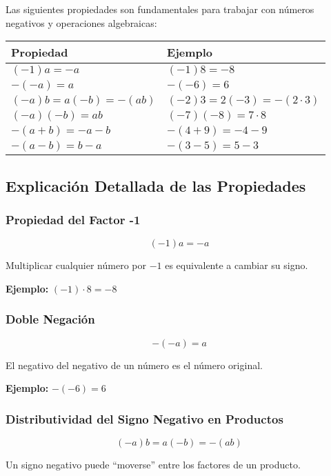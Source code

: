 
Las siguientes propiedades son fundamentales para trabajar con números negativos y operaciones algebraicas:

\begin{center}
\begin{tabular}{|l|l|}
\hline
\textbf{Propiedad} & \textbf{Ejemplo} \\
\hline
$(-1)a = -a$ & $(-1)8 = -8$ \\
\hline
$-(-a) = a$ & $-(-6) = 6$ \\
\hline
$(-a)b = a(-b) = -(ab)$ & $(-2)3 = 2(-3) = -(2 \cdot 3)$ \\
\hline
$(-a)(-b) = ab$ & $(-7)(-8) = 7 \cdot 8$ \\
\hline
$-(a + b) = -a - b$ & $-(4 + 9) = -4 - 9$ \\
\hline
$-(a - b) = b - a$ & $-(3 - 5) = 5 - 3$ \\
\hline
\end{tabular}
\end{center}

\subsection{Explicación Detallada de las Propiedades}

\subsubsection{Propiedad del Factor -1}
$$(-1)a = -a$$

Multiplicar cualquier número por $-1$ es equivalente a cambiar su signo.

\textbf{Ejemplo:} $(-1) \cdot 8 = -8$

\subsubsection{Doble Negación}
$$-(-a) = a$$

El negativo del negativo de un número es el número original.

\textbf{Ejemplo:} $-(-6) = 6$

\subsubsection{Distributividad del Signo Negativo en Productos}
$$(-a)b = a(-b) = -(ab)$$

Un signo negativo puede ``moverse'' entre los factores de un producto.

